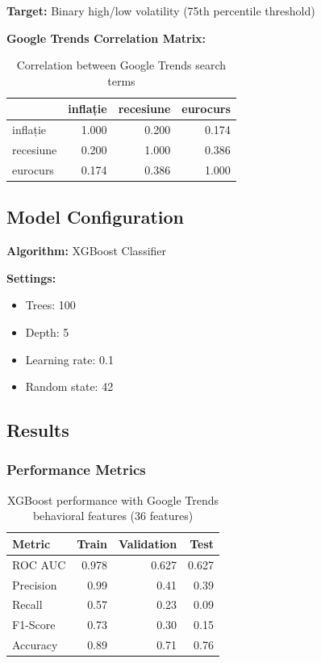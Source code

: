 \documentclass[12pt,a4paper]{article}
\begin{document}
\textbf{Target:} Binary high/low volatility (75th percentile threshold)

\textbf{Google Trends Correlation Matrix:}
\begin{table}[h]
\centering
\begin{tabular}{lrrr}
\hline
& inflație & recesiune & eurocurs \\
\hline
inflație  & 1.000 & 0.200 & 0.174 \\
recesiune & 0.200 & 1.000 & 0.386 \\
eurocurs  & 0.174 & 0.386 & 1.000 \\
\hline
\end{tabular}
\caption{Correlation between Google Trends search terms}
\end{table}

\subsection{Model Configuration}

\textbf{Algorithm:} XGBoost Classifier

\textbf{Settings:}
\begin{itemize}
    \item Trees: 100
    \item Depth: 5
    \item Learning rate: 0.1
    \item Random state: 42
\end{itemize}

\subsection{Results}

\subsubsection{Performance Metrics}

\begin{table}[h]
\centering
\begin{tabular}{lrrr}
\hline
\textbf{Metric} & \textbf{Train} & \textbf{Validation} & \textbf{Test} \\
\hline
ROC AUC & 0.978 & 0.627 & 0.627 \\
Precision & 0.99 & 0.41 & 0.39 \\
Recall & 0.57 & 0.23 & 0.09 \\
F1-Score & 0.73 & 0.30 & 0.15 \\
Accuracy & 0.89 & 0.71 & 0.76 \\
\hline
\end{tabular}
\caption{XGBoost performance with Google Trends behavioral features (36 features)}
\end{table}
\end{document}

